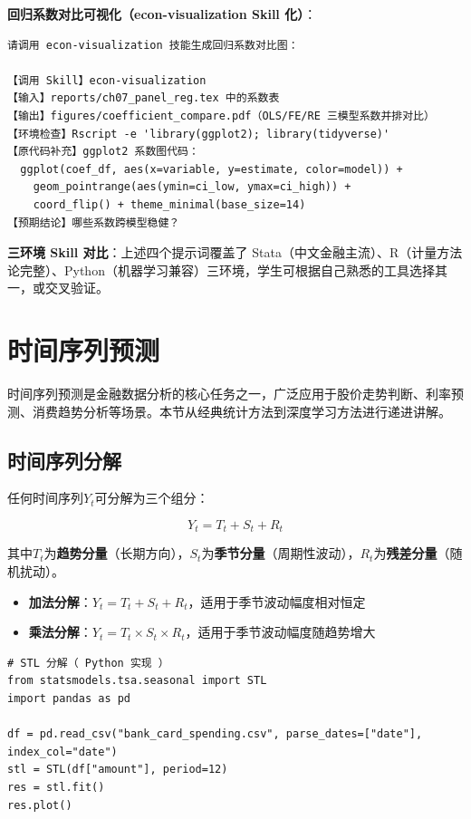 \textbf{回归系数对比可视化（econ-visualization Skill 化）}：
\begin{lstlisting}
请调用 econ-visualization 技能生成回归系数对比图：

【调用 Skill】econ-visualization
【输入】reports/ch07_panel_reg.tex 中的系数表
【输出】figures/coefficient_compare.pdf（OLS/FE/RE 三模型系数并排对比）
【环境检查】Rscript -e 'library(ggplot2); library(tidyverse)'
【原代码补充】ggplot2 系数图代码：
  ggplot(coef_df, aes(x=variable, y=estimate, color=model)) +
    geom_pointrange(aes(ymin=ci_low, ymax=ci_high)) +
    coord_flip() + theme_minimal(base_size=14)
【预期结论】哪些系数跨模型稳健？
\end{lstlisting}

\textbf{三环境 Skill 对比}：上述四个提示词覆盖了 Stata（中文金融主流）、R（计量方法论完整）、Python（机器学习兼容）三环境，学生可根据自己熟悉的工具选择其一，或交叉验证。

\section{时间序列预测}

时间序列预测是金融数据分析的核心任务之一，广泛应用于股价走势判断、利率预测、消费趋势分析等场景。本节从经典统计方法到深度学习方法进行递进讲解。

\subsection{时间序列分解}

任何时间序列$Y_t$可分解为三个组分：

\[
Y_t = T_t + S_t + R_t
\]

其中$T_t$为\textbf{趋势分量}（长期方向），$S_t$为\textbf{季节分量}（周期性波动），$R_t$为\textbf{残差分量}（随机扰动）。

\begin{itemize}[leftmargin=2em]
  \item \textbf{加法分解}：$Y_t = T_t + S_t + R_t$，适用于季节波动幅度相对恒定
  \item \textbf{乘法分解}：$Y_t = T_t \times S_t \times R_t$，适用于季节波动幅度随趋势增大
\end{itemize}

\begin{lstlisting}[style=python]
# STL 分解（ Python 实现 ）
from statsmodels.tsa.seasonal import STL
import pandas as pd

df = pd.read_csv("bank_card_spending.csv", parse_dates=["date"], index_col="date")
stl = STL(df["amount"], period=12)
res = stl.fit()
res.plot()
\end{lstlisting}

